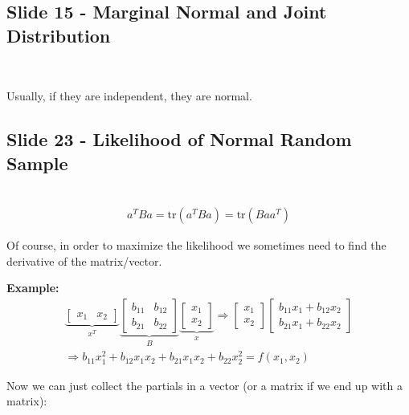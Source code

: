 \subsection{Slide 15 - Marginal Normal and Joint Distribution}\hfill\\
\par\bigskip
\noindent Usually, if they are independent, they are normal.
\par\bigskip
\subsection{Slide 23 - Likelihood of Normal Random Sample}\hfill\\
\begin{equation*}
  \begin{gathered}
    a^TBa = \text{tr}(a^TBa) = \text{tr}(Baa^T)
  \end{gathered}
\end{equation*}
\par\bigskip
\noindent Of course, in order to maximize the likelihood we sometimes need to find the derivative of the matrix/vector.
\par\bigskip
\noindent\textbf{Example:}
\begin{equation*}
  \begin{gathered}
    \underbrace{\begin{bmatrix}x_1& x_2\end{bmatrix}}_{\text{$x^T$}}\underbrace{\begin{bmatrix}b_{11}&b_{12}\\b_{21}&b_{22}\end{bmatrix}}_{\text{$B$}}\underbrace{\begin{bmatrix}x_1\\x_2\end{bmatrix}}_{\text{$x$}}\Rightarrow \begin{bmatrix}x_1\\x_2\end{bmatrix}\begin{bmatrix}b_{11}x_1+b_{12}x_2\\b_{21}x_1+b_{22}x_2\end{bmatrix}\\
    \Rightarrow b_{11}x_1^2+b_{12}x_1x_2+b_{21}x_1x_2+b_{22}x_2^2 = f(x_1,x_2)
  \end{gathered}
\end{equation*}\par
\noindent Now we can just collect the partials in a vector (or a matrix if we end up with a matrix):
